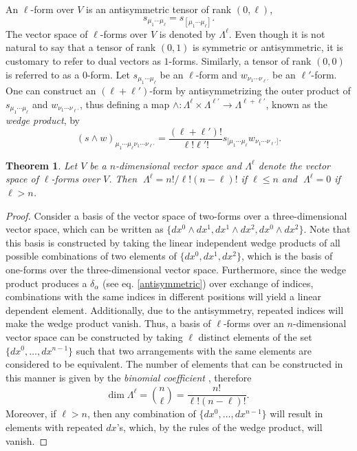 \documentclass[
12pt,		%
openright,	%
twoside,  %
a4paper,			%
chapter=TITLE,		%
english,			%
french,				%
spanish,			%
brazil				%
]{USPSC-classe/USPSC}
\newtheorem{theorem}{Theorem}[section]
\begin{document}
\begin{apendicesenv}
An $\ell$-form over $V$ is an antisymmetric tensor of rank $(0,\ell)$,
\begin{equation}
    s_{\mu_1\cdots\mu_{\ell}}=s_{[\mu_1\cdots\mu_{\ell}]}.
\end{equation}
The vector space of $\ell$-forms over $V$ is denoted by $\Lambda^{\ell}$. Even though it is not natural to say that a tensor of rank $(0,1)$ is symmetric or antisymmetric, it is customary to refer to dual vectors as $1$-forms. Similarly, a tensor of rank $(0,0)$ is referred to as a $0$-form. Let $s_{\mu_1\cdots\mu_{\ell}}$ be an $\ell$-form and $w_{\nu_1\cdots\nu_{\ell'}}$ be an $\ell'$-form. One can construct an $(\ell+\ell')$-form by antisymmetrizing the outer product of $s_{\mu_1\cdots\mu_{\ell}}$ and $w_{\nu_1\cdots\nu_{\ell'}}$, thus defining a map $\wedge:\Lambda^{\ell}\times\Lambda^{\ell'}\to\Lambda^{\ell+\ell'}$, known as the \textit{wedge product}, by
\begin{equation}\label{ori}
    (s\wedge w)_{\mu_1\cdots\mu_{\ell}\nu_1\cdots\nu_{\ell'}}=\frac{(\ell+\ell')!}{\ell!\ell'!}s_{[\mu_1\cdots\mu_{\ell}}w_{\nu_1\cdots\nu_{\ell'}]}.
\end{equation}
\begin{theorem}\label{propform}
    Let $V$ be a $n$-dimensional vector space and $\Lambda^{\ell}$ denote the vector space of $\ell$-forms over $V$. Then $\;\Lambda^{\ell}=n!/\ell!(n-\ell)!$ \textit{if} $\ell\leq n$ \textit{and} $\;\Lambda^{\ell}=0$ \textit{if} $\ell>n$.
\end{theorem}
\begin{proof}
   Consider a basis of the vector space of two-forms over a three-dimensional vector space, which can be written as $\{dx^0\wedge dx^1,dx^1\wedge dx^2,dx^0\wedge dx^2 \}$. Note that this basis is constructed by taking the linear independent wedge products of all possible combinations of two elements of $\{dx^0,dx^1,dx^2\}$, which is the basis of one-forms over the three-dimensional vector space. Furthermore, since the wedge product produces a $\delta_{\alpha}$ (see eq. \ref{antisymmetric}) over exchange of indices, combinations with the same indices in different positions will yield a linear dependent element. Additionally, due to the antisymmetry, repeated indices will make the wedge product vanish. Thus, a basis of $\ell$-forms over an $n$-dimensional vector space can be constructed by taking $\ell$ distinct elements of the set $\{dx^0,\ldots,dx^{n-1}\}$ such that two arrangements with the same elements are considered to be equivalent. The number of elements that can be constructed in this manner is given by the \textit{binomial coefficient} \cite{Bryant1993}, therefore
    \begin{equation}
        \text{dim}\;\Lambda^{\ell}=\binom{n}{\ell}=\frac{n!}{\ell!(n-\ell)!}.
    \end{equation}
    Moreover, if $\ell>n$, then any combination of $\{dx^0,\ldots,dx^{n-1}\}$ will result in elements with repeated $dx$'s, which, by the rules of the wedge product, will vanish.
\end{proof}


\end{apendicesenv}
\end{document}
